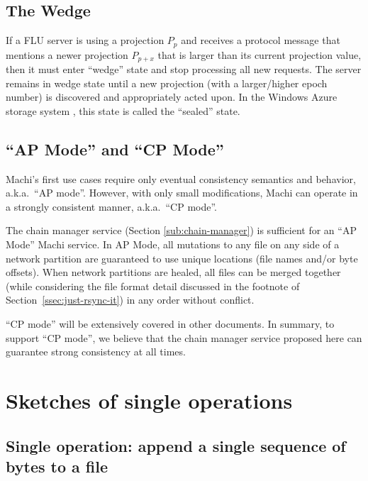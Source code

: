 \documentclass[preprint,10pt]{sigplanconf}
\begin{document}
\subsection{The Wedge}
\label{sub:wedge}

If a FLU server is using a projection $P_p$ and receives a protocol
message that mentions a newer projection $P_{p+x}$ that is larger than its
current projection value, then it must enter ``wedge'' state and stop
processing all new requests.  The server remains in wedge state until
a new projection (with a larger/higher epoch number) is discovered and
appropriately acted upon.
In the Windows Azure storage system \cite{was}, this state is called
the ``sealed'' state.

\subsection{``AP Mode'' and ``CP Mode''}
\label{sub:ap-cp-mode}

Machi's first use cases require only eventual consistency semantics
and behavior, a.k.a.~``AP mode''.  However, with only small
modifications, Machi can operate in a strongly consistent manner,
a.k.a.~``CP mode''.

The chain manager service (Section \ref{sub:chain-manager}) is
sufficient for an ``AP Mode'' Machi service.  In AP Mode, all mutations
to any file on any side of a network partition are guaranteed to use
unique locations (file names and/or byte offsets).  When network
partitions are healed, all files can be merged together
(while considering the file format detail discussed in
the footnote of Section~\ref{ssec:just-rsync-it}) in any order
without conflict.

``CP mode'' will be extensively covered in other documents.  In summary,
to support ``CP mode'', we believe that the chain manager
service proposed here can guarantee strong consistency
at all times.

\section{Sketches of single operations}
\label{sec:sketches}

\subsection{Single operation: append a single sequence of bytes to a file}
\label{sec:sketch-append}
\end{document}
